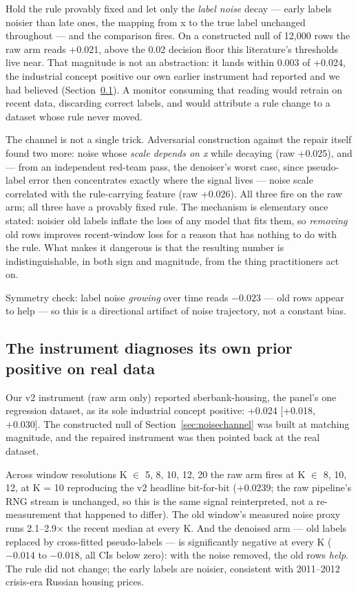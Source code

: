 \documentclass[10pt]{article} %
\begin{document}
Hold the rule provably fixed and let only the \emph{label noise} decay --- early labels noisier than
late ones, the mapping from x to the true label unchanged throughout --- and the comparison fires.
On a constructed null of 12,000 rows the raw arm reads +0.021, above the 0.02 decision floor
this literature's thresholds live near. That magnitude is not an abstraction: it lands within
0.003 of +0.024, the industrial concept positive our own earlier instrument had reported and
we had believed (Section~\ref{sec:diagnosis}). A monitor consuming that reading would retrain on recent data, discarding
correct labels, and would attribute a rule change to a dataset whose rule never moved.

The channel is not a single trick. Adversarial construction against the repair itself found two
more: noise whose \emph{scale depends on x} while decaying (raw +0.025), and --- from an independent
red-team pass, the denoiser's worst case, since pseudo-label error then concentrates exactly where
the signal lives --- noise scale correlated with the rule-carrying feature (raw +0.026). All
three fire on the raw arm; all three have a provably fixed rule. The mechanism is elementary once
stated: noisier old labels inflate the loss of any model that fits them, so \emph{removing} old rows
improves recent-window loss for a reason that has nothing to do with the rule. What makes it
dangerous is that the resulting number is indistinguishable, in both sign and magnitude, from the
thing practitioners act on.

Symmetry check: label noise \emph{growing} over time reads $-0.023$ --- old rows appear to help --- so
this is a directional artifact of noise trajectory, not a constant bias.

\subsection{The instrument diagnoses its own prior positive on real data}\label{sec:diagnosis}

Our v2 instrument (raw arm only) reported sberbank-housing, the panel's one regression dataset, as
its sole industrial concept positive: +0.024 [+0.018, +0.030]. The constructed null of Section~\ref{sec:noisechannel}
was built at matching magnitude, and the repaired instrument was then pointed back at the real
dataset.

Across window resolutions K $\in$ {5, 8, 10, 12, 20} the raw arm fires at K $\in$ {8, 10, 12}, at K = 10
reproducing the v2 headline bit-for-bit (+0.0239; the raw pipeline's RNG stream is unchanged,
so this is the same signal reinterpreted, not a re-measurement that happened to differ). The old
window's measured noise proxy runs 2.1--2.9$\times$ the recent median at every K. And the denoised arm
--- old labels replaced by cross-fitted pseudo-labels --- is significantly negative at every K
($-0.014$ to $-0.018$, all CIs below zero): with the noise removed, the old rows \emph{help}. The rule did
not change; the early labels are noisier, consistent with 2011--2012 crisis-era Russian housing
prices.
\end{document}
